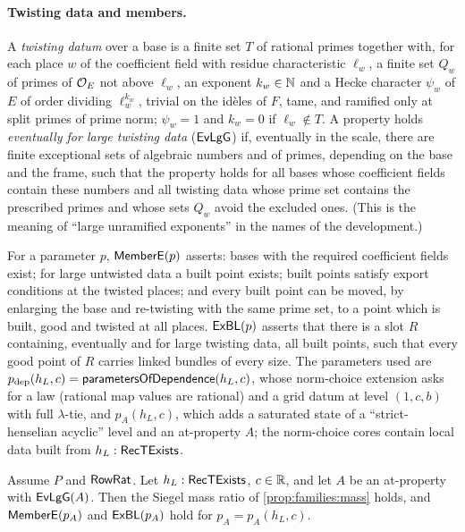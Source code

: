 \paragraph{Twisting data and members.}
\begin{definition}\label{def:families:twist}
A \emph{twisting datum} over a base is a finite set $T$ of rational primes together with, for each place $w$ of the
coefficient field with residue characteristic $\ell_w$, a finite set $Q_w$ of primes of $\mathcal{O}_E$ not above
$\ell_w$, an exponent $k_w\in\mathbb{N}$ and a Hecke character $\psi_w$ of $E$ of order dividing $\ell_w^{k_w}$, trivial on
the id\`eles of $F$, tame, and ramified only at split primes of prime norm; $\psi_w=1$ and $k_w=0$ if
$\ell_w\notin T$. A property holds \emph{eventually for large twisting data} ($\mathsf{EvLgG}$) if, eventually in
the scale, there are finite exceptional sets of algebraic numbers and of primes, depending on the base and the
frame, such that the property holds for all bases whose coefficient fields contain these numbers and all twisting
data whose prime set contains the prescribed primes and whose sets $Q_w$ avoid the excluded ones. (This is the
meaning of ``large unramified exponents'' in the names of the development.)
\end{definition}

For a parameter $p$, $\mathsf{MemberE}(p)$ asserts: bases with the required coefficient fields exist; for large
untwisted data a built point exists; built points satisfy export conditions at the twisted places; and every
built point can be moved, by enlarging the base and re-twisting with the same prime set, to a point which is
built, good and twisted at all places. $\mathsf{ExBL}(p)$ asserts that there is a slot $R$ containing, eventually
and for large twisting data, all built points, such that every good point of $R$ carries linked bundles of every
size. The parameters used are $p_{\mathrm{dep}}(h_L,c)=\mathsf{parametersOfDependence}(h_L,c)$, whose norm-choice
extension asks for a law (rational map values are rational) and a grid datum at level $(1,c,b)$ with full
$\lambda$-tie, and $p_A(h_L,c)$, which adds a saturated state of a ``strict-henselian acyclic'' level and an
at-property $A$; the norm-choice cores contain local data built from $h_L:\mathsf{RecTExists}$.

\begin{theorem}\Fmark\label{thm:member-bundles}
Assume $P$ and $\mathsf{RowRat}$. Let $h_L:\mathsf{RecTExists}$, $c\in\mathbb{R}$, and let $A$ be an at-property with
$\mathsf{EvLgG}(A)$. Then the Siegel mass ratio of \cref{prop:families:mass} holds, and $\mathsf{MemberE}(p_A)$
and $\mathsf{ExBL}(p_A)$ hold for $p_A=p_A(h_L,c)$.
\end{theorem}

